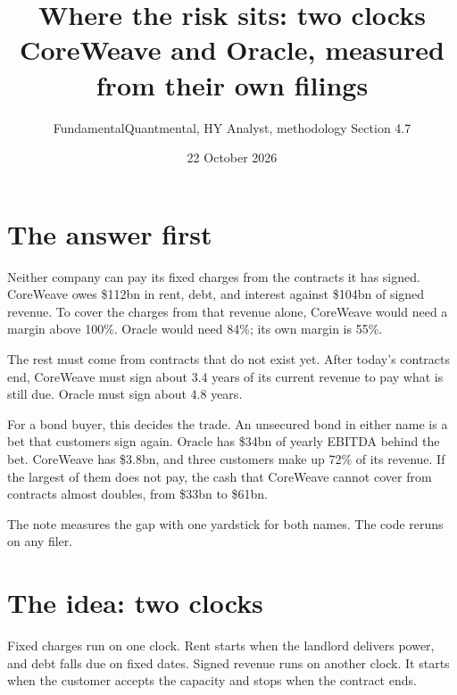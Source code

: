 \documentclass[11pt,a4paper]{article}
\title{Where the risk sits: two clocks\\[2pt]\large CoreWeave and Oracle, measured from their own filings}
\author{FundamentalQuantmental, HY Analyst, methodology Section 4.7}
\date{22 October 2026}
\begin{document}
\maketitle

\noindent{}

\section*{The answer first}

Neither company can pay its fixed charges from the contracts it has signed. CoreWeave owes \$112bn in rent, debt, and interest against \$104bn of signed revenue. To cover the charges from that revenue alone, CoreWeave would need a margin above 100\%. Oracle would need 84\%; its own margin is 55\%.

The rest must come from contracts that do not exist yet. After today's contracts end, CoreWeave must sign about 3.4 years of its current revenue to pay what is still due. Oracle must sign about 4.8 years.

For a bond buyer, this decides the trade. An unsecured bond in either name is a bet that customers sign again. Oracle has \$34bn of yearly EBITDA behind the bet. CoreWeave has \$3.8bn, and three customers make up 72\% of its revenue. If the largest of them does not pay, the cash that CoreWeave cannot cover from contracts almost doubles, from \$33bn to \$61bn.

The note measures the gap with one yardstick for both names. The code reruns on any filer.

\section{The idea: two clocks}

Fixed charges run on one clock. Rent starts when the landlord delivers power, and debt falls due on fixed dates. Signed revenue runs on another clock. It starts when the customer accepts the capacity and stops when the contract ends.
\end{document}
